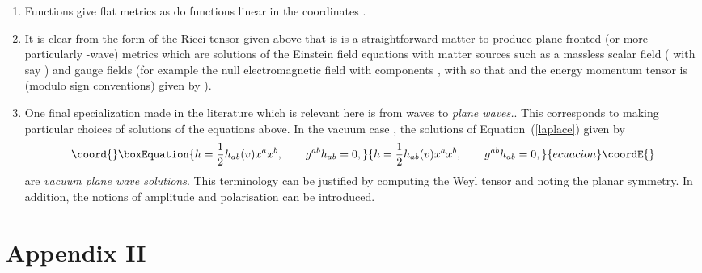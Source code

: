 \documentclass[12pt,a4paper]{article}
\newcounter{eg}
\providecommand{\initiate}{\setcounter{equation}{0}}
\begin{document}
\begin{enumerate}

\item Functions \coordHE{} give flat metrics as do functions linear in the
coordinates \coordHE{}.

\item It is clear from the form of the Ricci tensor given above that
  is is a straightforward matter to produce plane-fronted (or more
  particularly \coordHE{}-wave) metrics which are solutions of the Einstein
  field equations with matter sources such as a massless scalar field
  (\coordHE{}
  with say \coordHE{} ) and gauge fields (for example the
  null electromagnetic field with components
  \coordHE{}, with
  \coordHE{} so that \coordHE{}
  and the energy momentum tensor is (modulo sign conventions) given by
  \coordHE{}).
  
\item One final specialization made in the literature which is
  relevant here is from \coordHE{} waves to {\it plane waves.}. This
  corresponds to making particular choices of solutions of the
  equations above. In the vacuum case , the solutions of
  Equation~(\ref{laplace}) given by
\begin{equation}\coord{}\boxEquation{
h = \frac 12 h_{ab}(v)x^{a}x^{b}, \qquad g^{ab} h_{ab} = 0, \label{vpws}
}{
h = \frac 12 h_{ab}(v)x^{a}x^{b}, \qquad g^{ab} h_{ab} = 0, }{ecuacion}\coordE{}\end{equation}
are {\it vacuum plane wave solutions}. This terminology can be
justified by computing the Weyl tensor and noting the planar symmetry.
In addition, the notions of amplitude and polarisation can be
introduced.

\end{enumerate}


\initiate
\section*{Appendix II}
\setcounter{section}{2}
\end{document}
